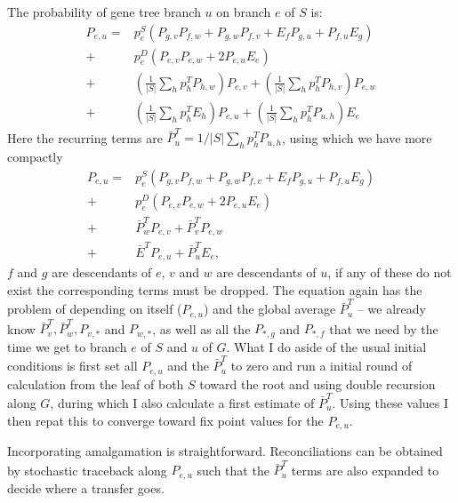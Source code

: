 \documentclass[preprint,superscriptaddress,aip,author-year]{revtex4-1}
\begin{document}
The probability of gene tree branch $u$ on branch $e$ of $S$ is:
\begin{align}
P_{e,u} =&  p^S_e \left( P_{g,v} P_{f,w} + P_{g,w} P_{f,v} + E_f P_{g,u} + P_{f,u} E_g
\right) \nonumber \\
+& p^D_e \left( P_{e,v} P_{e,w} + 2 P_{e,u} E_e \right) \nonumber \\
+&\left( \frac{1}{|S|} \sum_h p^T_h  P_{h,w} \right)  P_{e,v}  +
   \left( \frac{1}{|S|} \sum_h p^T_h  P_{h,v} \right) P_{e,w}\nonumber \\ +& \left(
   \frac{1}{|S|} \sum_h p^T_h  E_h \right)  P_{e,u}  + \left( \frac{1}{|S|} \sum_h p^T_h  P_{u,h} \right)  E_e 
\end{align}
Here the recurring terms are $\bar P^T_u = 1/|S| \sum_h p^T_h P_{u,h}$,
using which we have more compactly   
\begin{align}
P_{e,u} =&  p^S_e \left( P_{g,v} P_{f,w} + P_{g,w} P_{f,v} + E_f P_{g,u} + P_{f,u} E_g
\right) \nonumber \\
+& p^D_e \left( P_{e,v} P_{e,w} + 2 P_{e,u} E_e \right) \nonumber \\
+&\bar P^T_w  P_{e,v}  + \bar P^T_v P_{e,w}\nonumber \\ +& \bar E^T P_{e,u}  + \bar P^T_u  E_e,
\end{align}
$f$ and
$g$ are descendants of $e$, $v$ and
$w$ are descendants of $u$,  if any of these do not exist the corresponding
terms must be dropped.
The equation again has the problem of depending on itself ($P_{e,u}$) and
the global average $\bar P^T_{u}$ -- we already know $\bar P^T_v,\bar
P^T_w ,P_{v,*}$ and $P_{w,*}$,
as well as  all the $P_{*,g}$ and $P_{*,f}$ that we need by the
time we get to branch $e$ of $S$ and $u$ of $G$. What I do
aside of the usual initial conditions is first set all $P_{e,u}$ and
the $\bar
P^T_u$  to zero
and run a initial round of calculation from the leaf of both $S$ 
toward the root and using double recursion along $G$,
during which I also calculate a first estimate of $\bar
P^T_u$.
Using these values I then repat this to converge toward fix point values for the $P_{e,u}$.    

Incorporating amalgamation is straightforward. Reconciliations can be
obtained by stochastic traceback along $P_{e,u}$ such that the $\bar
P^T_u$ terms are also expanded to decide where a transfer goes.
  
\end{document}
